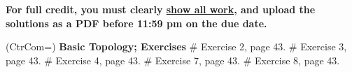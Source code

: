\documentclass[11pt]{book}
\begin{document}
\thispagestyle{fancy}
\noindent	\textbf{For full credit, you must clearly \underline{show all work}, and upload the solutions as a PDF before 11:59 pm on the due date.}\hfill
\vspace{0.3in}

\begin{easylist}
\ListProperties(CtrCom=\fbox)
\noindent \textbf{Basic Topology; Exercises}
\vspace{0.2in}
# Exercise 2, page 43.
\vspace{0.2in}
# Exercise 3, page 43.
\vspace{0.2in}
# Exercise 4, page 43.
\vspace{0.2in}
# Exercise 7, page 43.  
\vspace{0.2in}
# Exercise 8, page 43. 

\end{easylist}
\end{document}
